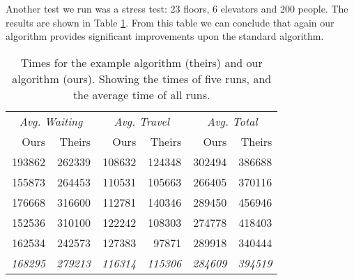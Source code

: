\documentclass[a4paper,11pt,twocolumn]{article}
\begin{document}
Another test we run was a stress test: 23 floors, 6 elevators and 200 people. The results are shown in Table \ref{tbl:6car_23lev_200pop_results}. From this table we can conclude that again our algorithm provides significant improvements upon the standard algorithm.
\begin{center}
 \begin{table}[ht]
 \begin{tabular}{rr|rr|rr}
  \hline
  \multicolumn{2}{c|}{\emph{Avg. Waiting}} & \multicolumn{2}{c|}{\emph{Avg. Travel}} & \multicolumn{2}{c}{\emph{Avg. Total}}\\
  Ours		& Theirs	& Ours 		& Theirs & Ours & Theirs \\
  \hline
   193862 & 262339 & 108632 & 124348 & 302494 & 386688\\
   155873 & 264453 & 110531 & 105663 & 266405 & 370116\\
   176668 & 316600 & 112781 & 140346 & 289450 & 456946\\
   152536 & 310100 & 122242 & 108303 & 274778 & 418403\\
   162534 & 242573 & 127383 & 97871  & 289918 & 340444\\
      
  \hline
  \emph{168295} & \emph{279213} & \emph{116314} & \emph{115306} & \emph{284609} & \emph{394519}\\  
\hline
 \end{tabular}
 \caption{Times for the example algorithm (theirs) and our algorithm (ours). Showing the times of five runs, and the average time of all runs.}
 \label{tbl:6car_23lev_200pop_results}
\end{table}
\end{center}


\end{document}
